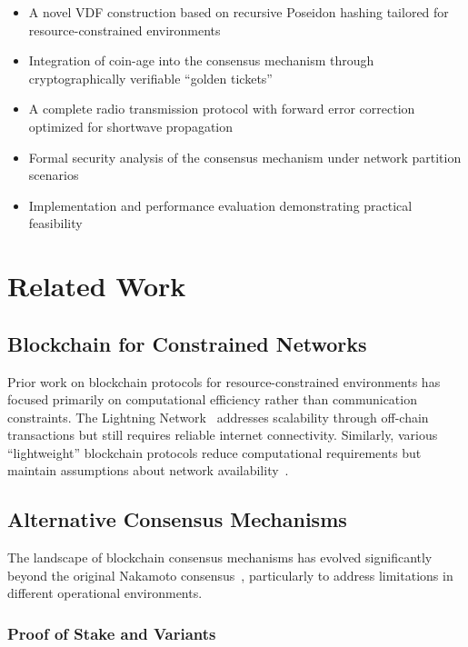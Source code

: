 \documentclass[11pt,a4paper]{article}
\begin{document}
\begin{itemize}
\item A novel VDF construction based on recursive Poseidon hashing tailored for resource-constrained environments
\item Integration of coin-age into the consensus mechanism through cryptographically verifiable ``golden tickets''
\item A complete radio transmission protocol with forward error correction optimized for shortwave propagation
\item Formal security analysis of the consensus mechanism under network partition scenarios
\item Implementation and performance evaluation demonstrating practical feasibility
\end{itemize}

\section{Related Work}

\subsection{Blockchain for Constrained Networks}

Prior work on blockchain protocols for resource-constrained environments has focused primarily on computational efficiency rather than communication constraints. The Lightning Network~\cite{lightning} addresses scalability through off-chain transactions but still requires reliable internet connectivity. Similarly, various ``lightweight'' blockchain protocols reduce computational requirements but maintain assumptions about network availability~\cite{kiayias2017ouroboros}.

\subsection{Alternative Consensus Mechanisms}

The landscape of blockchain consensus mechanisms has evolved significantly beyond the original Nakamoto consensus~\cite{nakamoto2008bitcoin}, particularly to address limitations in different operational environments.

\subsubsection{Proof of Stake and Variants}
\end{document}

